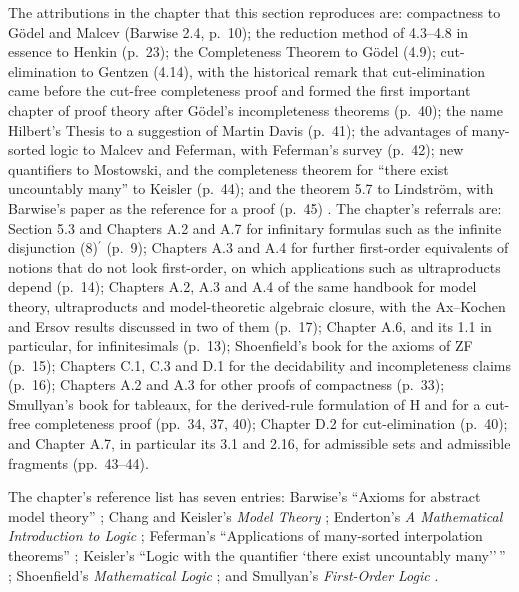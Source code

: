 The attributions in the chapter that this section reproduces are:
compactness to G\"odel and Malcev (Barwise 2.4, p.~10); the reduction
method of 4.3--4.8 in essence to Henkin (p.~23); the Completeness Theorem
to G\"odel (4.9); cut-elimination to Gentzen (4.14), with the historical
remark that cut-elimination came before the cut-free completeness proof and
formed the first important chapter of proof theory after G\"odel's
incompleteness theorems (p.~40); the name Hilbert's
Thesis to a suggestion of Martin Davis (p.~41); the advantages of
many-sorted logic to Malcev and Feferman, with Feferman's survey (p.~42);
new quantifiers to Mostowski, and the completeness theorem for ``there
exist uncountably many'' to Keisler (p.~44); and the theorem 5.7 to
Lindstr\"om, with Barwise's paper as the reference for a proof (p.~45)
\cite{Barwise1977FirstOrder}.  The chapter's referrals are: Section 5.3 and Chapters A.2 and A.7 for
infinitary formulas such as the infinite disjunction (8)\(^{\prime}\) (p.~9);
Chapters A.3 and A.4 for further first-order equivalents of notions that
do not look first-order, on which applications such as ultraproducts
depend (p.~14); Chapters A.2,
A.3 and A.4 of the same handbook for model theory, ultraproducts and
model-theoretic algebraic closure, with the Ax--Kochen and Ersov results
discussed in two of them (p.~17); Chapter A.6, and its 1.1 in particular,
for infinitesimals (p.~13); Shoenfield's book for the axioms of ZF
\cite{Shoenfield1967} (p.~15); Chapters C.1, C.3 and D.1 for the
decidability and incompleteness claims (p.~16); Chapters A.2 and A.3 for
other proofs of compactness (p.~33); Smullyan's book for tableaux, for the
derived-rule formulation of H and for a cut-free completeness proof
\cite{Smullyan1968} (pp.~34, 37, 40); Chapter D.2 for cut-elimination
(p.~40); and Chapter A.7, in particular its 3.1 and 2.16, for admissible
sets and admissible fragments (pp.~43--44).

The chapter's reference list \cite[ch.~A.1, pp.~45--46]{Barwise1977FirstOrder}
has seven entries: Barwise's ``Axioms for abstract model theory''
\cite{Barwise1974Axioms}; Chang and Keisler's \emph{Model Theory}
\cite{ChangKeisler1973}; Enderton's \emph{A Mathematical Introduction to
Logic} \cite{Enderton1972}; Feferman's ``Applications of many-sorted
interpolation theorems'' \cite{Feferman1974ManySorted}; Keisler's ``Logic
with the quantifier `there exist uncountably many''\,'' \cite{Keisler1970};
Shoenfield's \emph{Mathematical Logic} \cite{Shoenfield1967}; and
Smullyan's \emph{First-Order Logic} \cite{Smullyan1968}.
